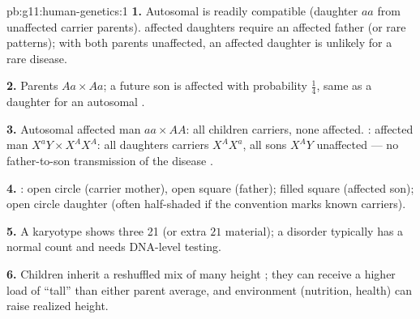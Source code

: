 \begin{solution}{pb:g11:human-genetics:1}
\textbf{1.} Autosomal  is readily compatible (daughter $aa$ from
unaffected carrier parents).   affected daughters require an
affected father (or rare patterns); with both parents unaffected, an affected
daughter is unlikely for a rare   disease.

\textbf{2.} Parents $Aa \times Aa$; a future son is affected with probability
$\tfrac14$, same as a daughter for an autosomal .

\textbf{3.} Autosomal  affected man $aa \times AA$: all children
carriers, none affected. : affected man $X^{a}Y \times X^{A}X^{A}$:
all daughters carriers $X^{A}X^{a}$, all sons $X^{A}Y$ unaffected --- no
father-to-son transmission of the disease .

\textbf{4.} : open circle (carrier mother), open square (father);
filled square (affected son); open circle daughter (often half-shaded if the
convention marks known carriers).

\textbf{5.} A karyotype shows three  21 (or extra $21$ material);
a  disorder typically has a normal  count and needs
DNA-level testing.

\textbf{6.} Children inherit a reshuffled mix of many height ; they can
receive a higher load of ``tall''  than either parent average, and
environment (nutrition, health) can raise realized height.
\end{solution}
